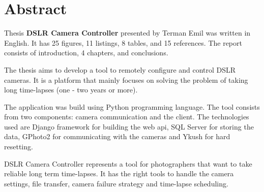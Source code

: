 \section*{Abstract}

Thesis \textbf{DSLR Camera Controller} presented by Terman Emil was written in English. It has 25 figures, 11 listings, 8 tables, and 15 references. The report consists of introduction, 4 chapters, and conclusions.

The thesis aims to develop a tool to remotely configure and control DSLR cameras. It is a platform that mainly focuses on solving the problem of taking long time-lapses (one - two years or more).

The application was build using Python programming language. The tool consists from two components: camera communication and the client. The technologies used are Django framework for building the web api, SQL Server for storing the data, GPhoto2 for communicating with the cameras and Ykush for hard resetting.

DSLR Camera Controller represents a tool for photographers that want to take reliable long term time-lapses. It has the right tools to handle the camera settings, file transfer, camera failure strategy and time-lapse scheduling.